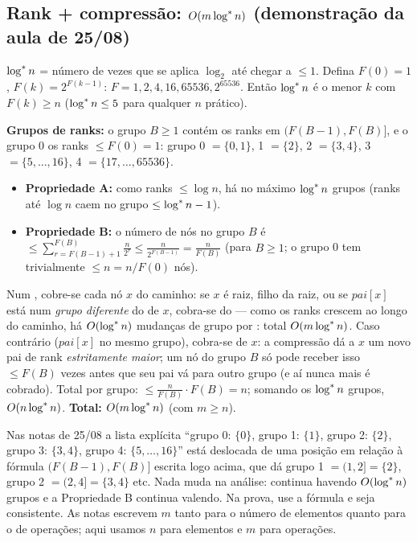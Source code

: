 \subsection{Rank + compressão: $O(m\log^{*} n)$ (demonstração da aula de 25/08)}
$\log^{*} n$ = número de vezes que se aplica $\log_2$ até chegar a $\le1$. Defina $F(0)=1$, $F(k)=2^{F(k-1)}$: $F=1,2,4,16,65536,2^{65536}$. Então $\log^{*} n$ é o menor $k$ com $F(k)\ge n$ ($\log^{*} n\le5$ para qualquer $n$ prático).

\textbf{Grupos de ranks:} o grupo $B\ge1$ contém os ranks em $(F(B-1),F(B)]$, e o grupo 0 os ranks $\le F(0)=1$: grupo 0 $=\{0,1\}$, 1 $=\{2\}$, 2 $=\{3,4\}$, 3 $=\{5,\dots,16\}$, 4 $=\{17,\dots,65536\}$.
\begin{itemize}
  \item \textbf{Propriedade A:} como ranks $\le\log n$, há no máximo $\log^{*} n$ grupos (ranks até $\log n$ caem no grupo $\le\log^{*} n-1$).
  \item \textbf{Propriedade B:} o número de nós no grupo $B$ é $\le\sum_{r=F(B-1)+1}^{F(B)}\frac{n}{2^r}\le\frac{n}{2^{F(B-1)}}=\frac{n}{F(B)}$ (para $B\ge1$; o grupo 0 tem trivialmente $\le n=n/F(0)$ nós).
\end{itemize}
Num \Find, cobre-se cada nó $x$ do caminho: se $x$ é raiz, filho da raiz, ou se $pai[x]$ está num \emph{grupo diferente} do de $x$, cobra-se do \Find{} --- como os ranks crescem ao longo do caminho, há $O(\log^{*} n)$ mudanças de grupo por \Find: total $O(m\log^{*} n)$. Caso contrário ($pai[x]$ no mesmo grupo), cobra-se de $x$: a compressão dá a $x$ um novo pai de rank \emph{estritamente maior}; um nó do grupo $B$ só pode receber isso $\le F(B)$ vezes antes que seu pai vá para outro grupo (e aí nunca mais é cobrado). Total por grupo: $\le\frac{n}{F(B)}\cdot F(B)=n$; somando os $\log^{*} n$ grupos, $O(n\log^{*} n)$. \textbf{Total: $O(m\log^{*} n)$} (com $m\ge n$).

\begin{cuidado}
Nas notas de 25/08 a lista explícita ``grupo 0: $\{0\}$, grupo 1: $\{1\}$, grupo 2: $\{2\}$, grupo 3: $\{3,4\}$, grupo 4: $\{5,\dots,16\}$'' está deslocada de uma posição em relação à fórmula $(F(B-1),F(B)]$ escrita logo acima, que dá grupo 1 $=(1,2]=\{2\}$, grupo 2 $=(2,4]=\{3,4\}$ etc. Nada muda na análise: continua havendo $O(\log^{*} n)$ grupos e a Propriedade B continua valendo. Na prova, use a fórmula e seja consistente. As notas escrevem $m$ tanto para o número de elementos quanto para o de operações; aqui usamos $n$ para elementos e $m$ para operações.
\end{cuidado}

